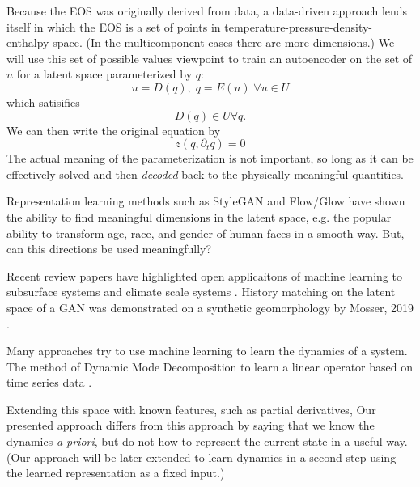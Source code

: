 \documentclass[AMA,STIX1COL]{WileyNJD-v2}
\begin{document}
Because the EOS was originally derived from data, a data-driven
approach lends itself in which the EOS is a set of points in
temperature-pressure-density-enthalpy space. (In the multicomponent
cases there are more dimensions.)
We will use this set of possible values viewpoint to train an
autoencoder on the set of $u$ for a latent space parameterized by $q$:
\begin{equation}
u = D(q), \; q=E(u) \;\forall u \in U
\end{equation}
which satisifies
\begin{equation}
  D(q)\in U \forall q.
\end{equation}
We can then write the original equation by
\begin{equation}
z(q,\partial_t q)=0
\end{equation}
The actual meaning of the parameterization is not important, so long as
it can be effectively solved and then \emph{decoded} back to the
physically meaningful quantities.

Representation learning methods such as StyleGAN
\cite{karras_style-based_2018} and Flow/Glow \cite{kingma_glow:_2018} have shown
the ability to find meaningful dimensions in the latent space,
e.g. the popular ability to transform age, race, and gender of human
faces in a smooth way.
But, can this directions be used meaningfully?

Recent review papers have highlighted open applicaitons of machine
learning to subsurface systems \cite{bergen_machine_2019} and
climate scale systems  \cite{reichstein_deep_2019}.
History matching on the latent space of a GAN was demonstrated on a
synthetic geomorphology by Mosser, 2019 \cite{mosser_deepflow:_2019}.

Many approaches try to use machine learning to learn the dynamics of a
system.
The method of Dynamic Mode Decomposition
to learn a linear operator based on time series data \cite{tu_dynamic_2014,kutz_dynamic_2016}. 

Extending this space with known features, such as partial derivatives,
\cite{ one of kutz's students}
Our presented approach differs from this approach by saying that we
know the dynamics {\em a priori}, but do not how to represent the
current state in a useful way. (Our approach will be later extended to
learn dynamics in a second step using the learned representation as a
fixed input.)

\cite{wu_physics-informed_2018}
\cite{xie_tempogan:_2018}
\end{document}
